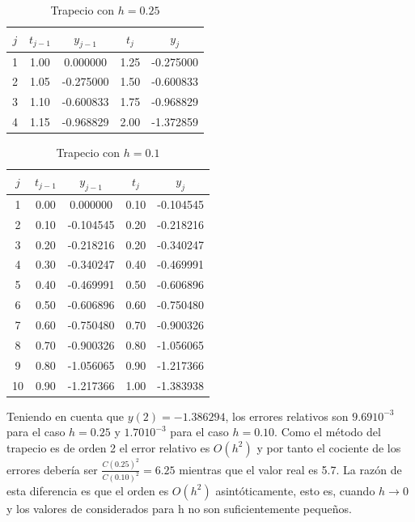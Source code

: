 \documentclass{article}
\theoremstyle{theorem-style}  %
\theoremstyle{definition-style}
\theoremstyle{example-style}
\begin{document}
	\begin{table}[H]
		\centering
		\begin{tabular}{|| c | c | c | c | c ||}
			\hline
			\hline $j$ &  $t_{j-1}$ & $y_{j-1}$ & $t_j$ & $y_j$ \\
			\hline 1 & 1.00 & 0.000000 & 1.25 & -0.275000 \\
			\hline 2 & 1.05 & -0.275000 & 1.50 & -0.600833 \\
			\hline 3 & 1.10 & -0.600833 & 1.75 & -0.968829 \\
			\hline 4 & 1.15 & -0.968829 & 2.00 & -1.372859 \\
		\end{tabular}
		\caption{Trapecio con $h=0.25$}
		\label{table:trapecio-ejemplo2.1}
	\end{table}
	
	\begin{table}[H]
		\centering
		\begin{tabular}{|| c | c | c | c | c ||}
			\hline
			\hline $j$ &  $t_{j-1}$ & $y_{j-1}$ & $t_j$ & $y_j$ \\
			\hline 1 & 0.00 & 0.000000 & 0.10 & -0.104545 \\
			\hline 2 & 0.10 & -0.104545 & 0.20 & -0.218216 \\
			\hline 3 & 0.20 & -0.218216 & 0.20 & -0.340247 \\
			\hline 4 & 0.30 & -0.340247 & 0.40 & -0.469991 \\
			\hline 5 & 0.40 & -0.469991 & 0.50 & -0.606896 \\
			\hline 6 & 0.50 & -0.606896 & 0.60 & -0.750480 \\
			\hline 7 & 0.60 & -0.750480 & 0.70 & -0.900326 \\
			\hline 8 & 0.70 & -0.900326 & 0.80 & -1.056065 \\
			\hline 9 & 0.80 & -1.056065 & 0.90 & -1.217366 \\
			\hline 10 & 0.90 & -1.217366 & 1.00 & -1.383938 \\
		\end{tabular}
		\caption{Trapecio con $h=0.1$}
		\label{table:trapecio-ejemplo2.2}
	\end{table}
	
	Teniendo en cuenta que $y(2)=-1.386294$, los errores relativos son $9.69 10^{-3}$ para el caso $h=0.25$ y $1.70 10^{-3}$ para el caso $h=0.10$. Como el método del trapecio es de orden 2 el error relativo es $O(h^2)$ y por tanto el cociente de los errores debería ser $\frac{C(0.25)^2}{C(0.10)^2}=6.25$ mientras que el valor real es 5.7. La razón de esta diferencia es que el orden es $O(h^2)$ asintóticamente, esto es, cuando $h \to 0$ y los valores de considerados para h no son suficientemente pequeños.
\end{document}
